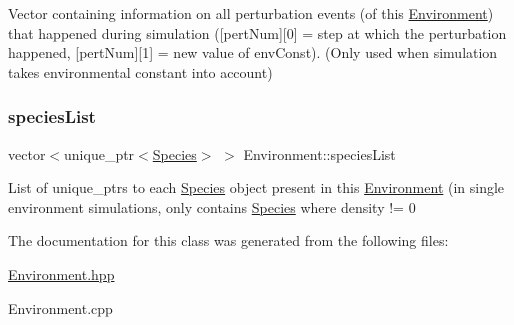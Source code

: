 Vector containing information on all perturbation events (of this \hyperlink{classEnvironment}{Environment}) that happened during simulation (\mbox{[}pert\+Num\mbox{]}\mbox{[}0\mbox{]} = step at which the perturbation happened, \mbox{[}pert\+Num\mbox{]}\mbox{[}1\mbox{]} = new value of env\+Const). (Only used when simulation takes environmental constant into account) \mbox{\label{classEnvironment_ac27d43c32a9db69a4115d09b3145831a}} 
\subsubsection{\texorpdfstring{species\+List}{speciesList}}
{\footnotesize\ttfamily vector$<$unique\+\_\+ptr$<$\hyperlink{classSpecies}{Species}$>$ $>$ Environment\+::species\+List\hspace{0.3cm}{\ttfamily [protected]}}

List of unique\+\_\+ptrs to each \hyperlink{classSpecies}{Species} object present in this \hyperlink{classEnvironment}{Environment} (in single environment simulations, only contains \hyperlink{classSpecies}{Species} where {\ttfamily density != 0} 

The documentation for this class was generated from the following files\+:\begin{DoxyCompactItemize}
\item 
\hyperlink{Environment_8hpp}{Environment.\+hpp}\item 
Environment.\+cpp\end{DoxyCompactItemize}
